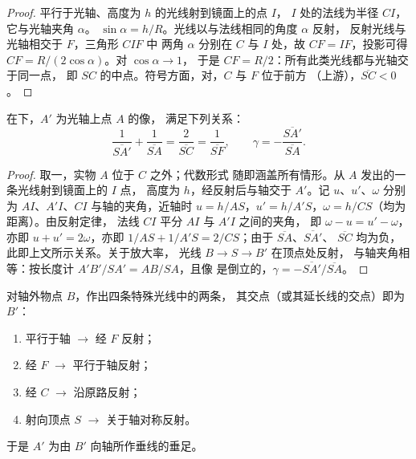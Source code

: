 \begin{proof}
平行于光轴、高度为 $h$ 的光线射到镜面上的点 $I$，
$I$ 处的法线为半径 $CI$，它与光轴夹角 $\alpha$。
$\sin\alpha = h/R$。光线以与法线相同的角度 $\alpha$ 反射，
反射光线与光轴相交于 $F$，三角形 $CIF$ 中
两角 $\alpha$ 分别在 $C$ 与 $I$ 处，故 $CF = IF$，投影可得
$CF = R/(2\cos\alpha)$。对 $\cos\alpha \to 1$，
于是 $CF = R/2$：所有此类光线都与光轴交于同一点，
即 $SC$ 的中点。符号方面，对，$C$ 与 $F$ 位于前方
（上游），$\overline{SC} < 0$。
\end{proof}

\begin{theorem}[球面镜的共轭关系]\label{thm:b1:mirrors-thin-lenses:mirrorconj}
在下，$A'$ 为光轴上点 $A$ 的像，
满足下列关系：
\[
\frac{1}{\overline{SA'}} + \frac{1}{\overline{SA}} = \frac{2}{\overline{SC}}
= \frac{1}{\overline{SF}},
\qquad
\gamma = -\frac{\overline{SA'}}{\overline{SA}} .
\]
\end{theorem}

\begin{proof}
取一，实物 $A$ 位于 $C$ 之外；代数形式
随即涵盖所有情形。从 $A$ 发出的一条光线射到镜面上的 $I$ 点，
高度为 $h$，经反射后与轴交于 $A'$。记 $u$、$u'$、$\omega$
分别为 $AI$、$A'I$、$CI$ 与轴的夹角，近轴时
$u = h/AS$，$u' = h/A'S$，$\omega = h/CS$（均为距离）。由反射定律，
法线 $CI$ 平分 $AI$ 与 $A'I$ 之间的夹角，
即 $\omega - u = u' - \omega$，亦即 $u + u' = 2\omega$，亦即
$1/AS + 1/A'S = 2/CS$；由于 $\overline{SA}$、$\overline{SA'}$、
$\overline{SC}$ 均为负，此即上文所示关系。关于放大率，
光线 $B \to S \to B'$ 在顶点处反射，
与轴夹角相等：按长度计 $A'B'/SA' = AB/SA$，且像
是倒立的，$\gamma = -\overline{SA'}/\overline{SA}$。
\end{proof}

\begin{method}[在镜中作像]\label{met:b1:mirrors-thin-lenses:mirrorrays}
对轴外物点 $B$，作出四条特殊光线中的两条，
其交点（或其延长线的交点）即为 $B'$：
\begin{enumerate}
  \item 平行于轴 $\to$ 经 $F$ 反射；
  \item 经 $F$ $\to$ 平行于轴反射；
  \item 经 $C$ $\to$ 沿原路反射；
  \item 射向顶点 $S$ $\to$ 关于轴对称反射。
\end{enumerate}
于是 $A'$ 为由 $B'$ 向轴所作垂线的垂足。
\end{method}


